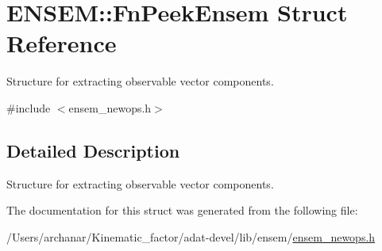 \hypertarget{structENSEM_1_1FnPeekEnsem}{}\section{E\+N\+S\+EM\+:\+:Fn\+Peek\+Ensem Struct Reference}
\label{structENSEM_1_1FnPeekEnsem}


Structure for extracting observable vector components.  




{\ttfamily \#include $<$ensem\+\_\+newops.\+h$>$}



\subsection{Detailed Description}
Structure for extracting observable vector components. 

The documentation for this struct was generated from the following file\+:\begin{DoxyCompactItemize}
\item 
/\+Users/archanar/\+Kinematic\+\_\+factor/adat-\/devel/lib/ensem/\mbox{\hyperlink{adat-devel_2lib_2ensem_2ensem__newops_8h}{ensem\+\_\+newops.\+h}}\end{DoxyCompactItemize}
